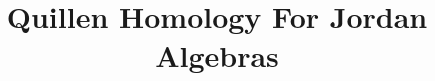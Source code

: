 \documentclass[11pt]{article}
\title{Quillen Homology For Jordan Algebras}
\author{}
\date{}
\begin{document}
\maketitle








\nocite{quillen1970cohomology}



\end{document}
